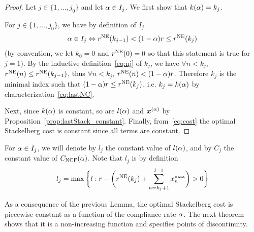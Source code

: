\begin{proof}
Let $j \in \{1, \dots, j_0\}$ and let $\alpha \in I_j$. We first show that $k(\alpha) = k_j$. 

For $j \in \{1, \dots, j_0\}$, we have by definition of $I_j$
\[
\alpha \in I_j \Leftrightarrow r^{\textup{NE}} ( k_{j-1} ) < (1-\alpha)r \leq  r^{\textup{NE}} ( k_j )
\]
(by convention, we let $k_0 = 0$ and $r^{\textup{NE}} ( 0 ) = 0$ so that this statement is true for $j=1$). By the inductive definition~\eqref{eq:nj} of $k_j$, we have $\forall n < k_j$, $r^{\textup{NE}} ( n ) \leq r^{\textup{NE}} ( k_{j-1} )$, thus $\forall n < k_j$, $r^{\textup{NE}} ( n ) < (1-\alpha)r$. Therefore $k_j$ is the minimal index such that $(1-\alpha)r \leq r^{\textup{NE}} ( k_j )$, i.e. $k_j = k(\alpha)$ by characterization~\eqref{eq:lastNC}.


Next, since $k(\alpha)$ is constant, so are $l(\alpha)$ and $\boldsymbol {x}^{(\alpha)}$ by Proposition~\ref{prop:lastStack_constant}. Finally, from~\eqref{eq:cost} the optimal Stackelberg cost is constant since all terms are constant.
\end{proof}

For $\alpha \in I_j$, we will denote by $l_j$ the constant value of $l(\alpha)$, and by $C_j$ the constant value of $C_{\textup{NCF}}(\alpha)$. Note that $l_j$ is by definition
\begin{equation}
\label{eq:l_j}
l_j = \max \bigg\{ l : r - \bigg( r^{\textup{NE}} ( k_{j} ) + \sum_{n=k_j+1}^{l-1}{x^{\max}_n} \bigg) > 0 \bigg\}
\end{equation}


As a consequence of the previous Lemma, the optimal Stackelberg cost is piecewise constant as a function of the compliance rate $\alpha$. The next theorem shows that it is a non-increasing function and specifies points of discontinuity.

